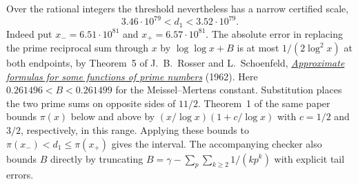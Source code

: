 Over the rational integers the threshold nevertheless has a narrow certified scale,
\[
                   3.46\cdot10^{79}<d_1<3.52\cdot10^{79}.
\]
Indeed put $x_-=6.51\cdot10^{81}$ and $x_+=6.57\cdot10^{81}$. The absolute error in replacing the prime reciprocal sum through $x$ by $\log\log x+B$ is at most $1/(2\log^2 x)$ at both endpoints, by Theorem~5 of J.~B.~Rosser and L.~Schoenfeld, \href{https://doi.org/10.1215/ijm/1255631807}{\emph{Approximate formulas for some functions of prime numbers}} (1962). Here $0.261496<B<0.261499$ for the Meissel--Mertens constant. Substitution places the two prime sums on opposite sides of $11/2$. Theorem~1 of the same paper bounds $\pi(x)$ below and above by $(x/\log x)(1+c/\log x)$ with $c=1/2$ and $3/2$, respectively, in this range. Applying these bounds to $\pi(x_-)<d_1\le\pi(x_+)$ gives the interval. The accompanying checker also bounds $B$ directly by truncating $B=\gamma-\sum_p\sum_{k\ge2}1/(kp^k)$ with explicit tail errors.
